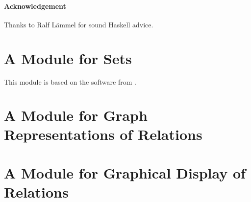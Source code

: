 \documentclass[11pt]{article}
\begin{document}
\paragraph{Acknowledgement} Thanks to Ralf L\"ammel for 
sound Haskell advice. 
    
\clearpage 
\appendix

\section{A Module for Sets}

This module is based on the software from \cite[Chapter 4]{DoeEij04:thr}.

 

\clearpage 

%
%
% 
%

\section{A Module for Graph Representations of Relations} 



\clearpage 
\section{A Module for Graphical Display of Relations} 





%
\end{document}
